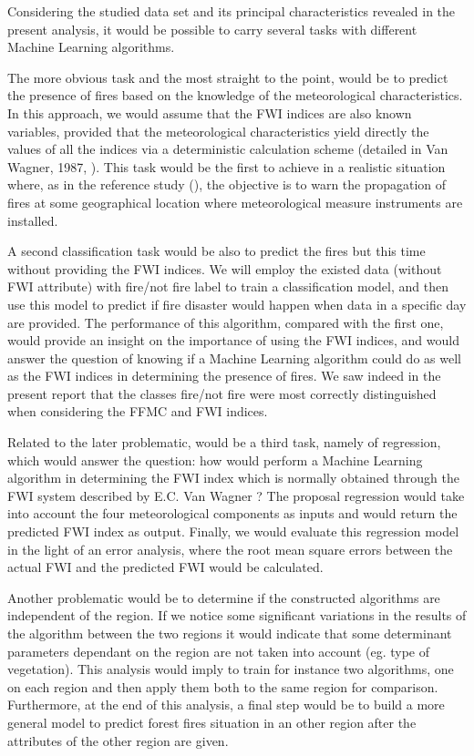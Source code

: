 \documentclass[10pt]{article}
\numberwithin{equation}{section}
\numberwithin{figure}{section}
\numberwithin{table}{section}
\begin{document}
Considering the studied data set and its principal characteristics revealed in the present analysis, it would be possible to carry several tasks with different Machine Learning algorithms. 

The more obvious task and the most straight to the point, would be to predict the presence of fires based on the knowledge of the meteorological characteristics. In this approach, we would assume that the FWI indices are also known variables, provided that the meteorological characteristics yield directly the values of all the indices via a deterministic calculation scheme (detailed in Van Wagner, 1987, \cite{FWI_Wagner}). This task would be the first to achieve in a realistic situation where, as in the reference study (\cite{article}), the objective is to warn the propagation of fires at some geographical location where meteorological measure instruments are installed.

A second classification task would be also to predict the fires but this time without providing the FWI indices. We will employ the existed data (without FWI attribute) with fire/not fire label to train a classification model, and then use this model to predict if fire disaster would happen when data in a specific day are provided. The performance of this algorithm, compared with the first one, would provide an insight on the importance of using the FWI indices, and would answer the question of knowing if a Machine Learning algorithm could do as well as the FWI indices in determining the presence of fires. We saw indeed in the present report that the classes fire/not fire were most correctly distinguished when considering the FFMC and FWI indices.

Related to the later problematic, would be a third task, namely of regression, which would answer the question: how would perform a Machine Learning algorithm in determining the FWI index which is normally obtained through the FWI system described by E.C. Van Wagner \cite{FWI_Wagner}? The proposal regression would take into account the four meteorological components as inputs and would return the predicted FWI index as output. Finally, we would evaluate this regression model in the light of an error analysis, where the root mean square errors between the actual FWI and the predicted FWI would be calculated.

Another problematic would be to determine if the constructed algorithms are independent of the region. If we notice some significant variations in the results of the algorithm between the two regions it would indicate that some determinant parameters dependant on the region are not taken into account (eg. type of vegetation). This analysis would imply to train for instance two algorithms, one on each region and then apply them both to the same region for comparison. Furthermore, at the end of this analysis, a final step would be to build a more general model to predict forest fires situation in an other region after the attributes of the other region are given. 
\end{document}
